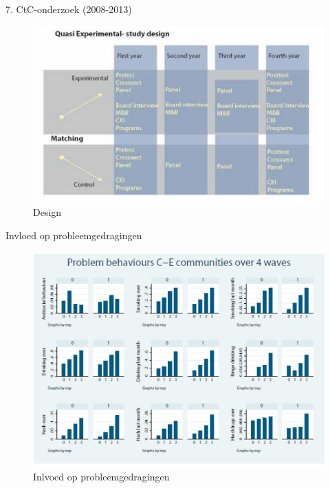 \documentclass[
  ignorenonframetext,
]{beamer}
\begin{document}
\begin{frame}{7. CtC-onderzoek (2008-2013)}
\protect\hypertarget{ctc-onderzoek-2008-2013}{}
\begin{figure}

{\centering \includegraphics{images/Design.png}

}

\caption{Design}

\end{figure}
\end{frame}

\begin{frame}{Invloed op probleemgedragingen}
\protect\hypertarget{invloed-op-probleemgedragingen}{}
\begin{figure}

{\centering \includegraphics{images/PGInvloed.png}

}

\caption{Inlvoed op probleemgedragingen}

\end{figure}
\end{frame}
\end{document}

